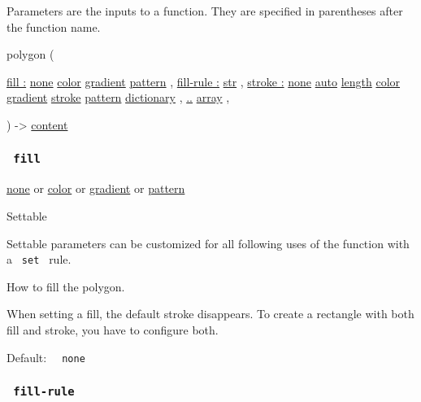 \label{parameters-tooltip}
Parameters are the inputs to a function. They are specified in
parentheses after the function name.

{ polygon } (

{ \hyperref[parameters-fill]{fill :}
\href{/docs/reference/foundations/none/}{none}
\href{/docs/reference/visualize/color/}{color}
\href{/docs/reference/visualize/gradient/}{gradient}
\href{/docs/reference/visualize/pattern/}{pattern} , } {
\hyperref[parameters-fill-rule]{fill-rule :}
\href{/docs/reference/foundations/str/}{str} , } {
\hyperref[parameters-stroke]{stroke :}
\href{/docs/reference/foundations/none/}{none}
\href{/docs/reference/foundations/auto/}{auto}
\href{/docs/reference/layout/length/}{length}
\href{/docs/reference/visualize/color/}{color}
\href{/docs/reference/visualize/gradient/}{gradient}
\href{/docs/reference/visualize/stroke/}{stroke}
\href{/docs/reference/visualize/pattern/}{pattern}
\href{/docs/reference/foundations/dictionary/}{dictionary} , } {
\hyperref[parameters-vertices]{..}
\href{/docs/reference/foundations/array/}{array} , }

) -\textgreater{} \href{/docs/reference/foundations/content/}{content}

\subsubsection{\texorpdfstring{\texttt{\ fill\ }}{ fill }}\label{parameters-fill}

\href{/docs/reference/foundations/none/}{none} {or}
\href{/docs/reference/visualize/color/}{color} {or}
\href{/docs/reference/visualize/gradient/}{gradient} {or}
\href{/docs/reference/visualize/pattern/}{pattern}

{{ Settable }}

\label{parameters-fill-settable-tooltip}
Settable parameters can be customized for all following uses of the
function with a \texttt{\ set\ } rule.

How to fill the polygon.

When setting a fill, the default stroke disappears. To create a
rectangle with both fill and stroke, you have to configure both.

Default: \texttt{\ }{\texttt{\ none\ }}\texttt{\ }

\subsubsection{\texorpdfstring{\texttt{\ fill-rule\ }}{ fill-rule }}\label{parameters-fill-rule}

